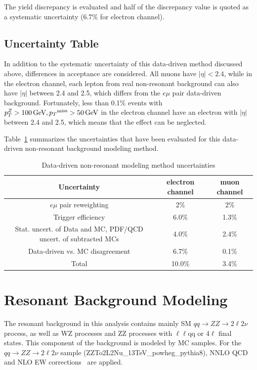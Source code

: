 \vspace{0.3cm}
The yield discrepancy is evaluated and half of the discrepancy value is quoted as a systematic uncertainty (6.7\% for electron channel).

\subsection{Uncertainty Table}
In addition to the systematic uncertainty of this data-driven method discussed above, differences in acceptance are considered. All muons have $|\eta|<2.4$, while in the electron channel, each lepton from real non-resonant background can also have $|\eta|$ between 2.4 and 2.5, which differs from the $e\mu$ pair data-driven background. Fortunately, less than 0.1\% events with $p_{T}^{Z}>100\,\text{Ge\hspace{-.08em}V}, {p_T}^\text{miss} >50\,\text{Ge\hspace{-.08em}V}$ in the electron channel have an electron with $|\eta|$ between 2.4 and 2.5, which means that the effect can be neglected. 

\vspace{0.3cm}
Table~\ref{tab:nonresuncert} summarizes the uncertainties that have been evaluated for this data-driven non-resonant background modeling method.
\begin{table}[htbp]
\begin{small}
  \begin{center}
    \caption{
      Data-driven non-resonant modeling method uncertainties
      \label{tab:nonresuncert}}
    \begin{tabular}{c|c c}
      \hline\hline
      Uncertainty & electron channel & muon channel \\
      \hline
      $e\mu$ pair reweighting & 2\% & 2\% \\
      Trigger efficiency & 6.0\% & 1.3\% \\
      Stat. uncert. of Data and MC, PDF/QCD uncert. of subtracted MCs  & 4.0\% & 2.4\% \\
      Data-driven vs. MC disagreement & 6.7\% & 0.1\% \\
      \hline
      Total  & 10.0\% & 3.4\% \\
      \hline\hline
    \end{tabular}
  \end{center}
\end{small}
\end{table}

\clearpage
\section{Resonant Background Modeling}
The resonant background in this analysis contains mainly SM $qq\rightarrow ZZ\rightarrow 2\ell 2\nu$ process, as well as WZ processes and ZZ processes with $\ell\ell$qq or 4$\ell$ final states. This component of the background is modeled by MC samples. For the $qq\rightarrow ZZ\rightarrow 2\ell 2\nu$ sample (ZZTo2L2Nu\_13TeV\_powheg\_pythia8), NNLO QCD~\cite{bg_nnloqcd} and NLO EW corrections~\cite{bg_nloqed1,bg_nloqed2} are applied.

